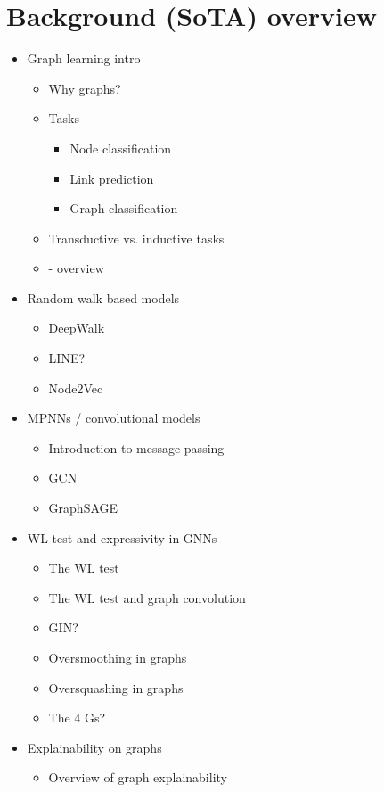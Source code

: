 \chapter{Background (SoTA) overview}
\label{chap:sota}

\begin{itemize}
	\item Graph learning intro
		\begin{itemize}
			\item Why graphs?
			\item Tasks
				\begin{itemize}
					\item Node classification
					\item Link prediction
					\item Graph classification
				\end{itemize}
			\item Transductive vs. inductive tasks
			\item \cite{gori_new_2005} - overview
		\end{itemize}
	\item Random walk based models
		\begin{itemize}
			\item DeepWalk
			\item LINE?
			\item Node2Vec
		\end{itemize}
	\item MPNNs / convolutional models
		\begin{itemize}
			\item Introduction to message passing
			\item GCN
			\item GraphSAGE
		\end{itemize}
	\item WL test and expressivity in GNNs
		\begin{itemize}
			\item The WL test
			\item The WL test and graph convolution
			\item GIN?
			\item Oversmoothing in graphs
			\item Oversquashing in graphs
			\item The 4 Gs?
		\end{itemize}
	\item Explainability on graphs
		\begin{itemize}
			\item Overview of graph explainability

\end{itemize}
\end{itemize}
